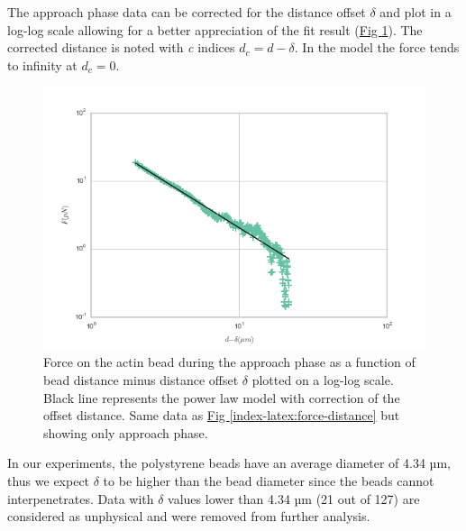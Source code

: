 \documentclass[A4paperpaper,11pt,english]{sphinxmanual}
\begin{document}
The approach phase data can be corrected for the distance offset \(\delta\)
and plot in a log-log scale allowing for a better appreciation of the fit
result (\hyperref[index-latex:force-distance-log-log]{Fig  \ref*{index-latex:force-distance-log-log}}). The corrected distance is noted with  \emph{c} indices \(d_c = d-
\delta\). In the model the force tends to infinity at \(d_c = 0\).
\begin{figure}[htbp]
\centering
\capstart

\includegraphics[width=0.800\linewidth]{force-distance-fit-loglog.png}
\caption{Force on the actin bead  during the approach phase as a function of bead distance
minus distance offset \(\delta\) plotted on a log-log scale. Black line
represents the power law model with  correction of the offset distance. Same
data as \hyperref[index-latex:force-distance]{Fig  \ref*{index-latex:force-distance}} but showing only approach phase.}\label{index-latex:force-distance-log-log}\end{figure}

In our experiments, the polystyrene beads have an average diameter of 4.34 µm,
thus we expect \(\delta\) to be higher than the bead diameter since the beads cannot interpenetrates.  Data with
\(\delta\) values lower than 4.34 µm (21 out of 127) are considered as
unphysical and were removed from further analysis.
\end{document}
